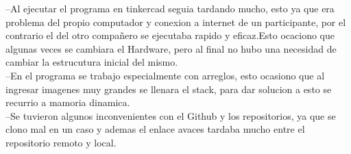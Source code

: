 \documentclass{article}
\begin{document}
--Al ejecutar el programa en tinkercad seguia tardando mucho, esto ya que era problema del propio computador y conexion a internet de un participante, por el contrario el del otro compañero se ejecutaba rapido y eficaz.Esto ocaciono que algunas veces se cambiara el Hardware, pero al final no hubo una necesidad de cambiar la estrucutura inicial del mismo.\\

--En el programa se trabajo especialmente con arreglos, esto ocasiono que al ingresar imagenes muy grandes se llenara el stack, para dar solucion a esto se recurrio a mamoria dinamica.\\

--Se tuvieron algunos inconvenientes con el Github y los repositorios, ya que se clono mal en un caso y ademas el enlace avaces tardaba mucho entre el repositorio remoto y local.\\
\end{document}
